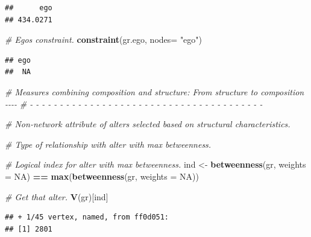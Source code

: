 \documentclass[
]{book}
\newenvironment{Shaded}{\begin{snugshade}}{\end{snugshade}}
\newcommand{\AttributeTok}[1]{\textcolor[rgb]{0.13,0.29,0.53}{#1}}
\newcommand{\CommentTok}[1]{\textcolor[rgb]{0.56,0.35,0.01}{\textit{#1}}}
\newcommand{\ConstantTok}[1]{\textcolor[rgb]{0.56,0.35,0.01}{#1}}
\newcommand{\FunctionTok}[1]{\textcolor[rgb]{0.13,0.29,0.53}{\textbf{#1}}}
\newcommand{\NormalTok}[1]{#1}
\newcommand{\OtherTok}[1]{\textcolor[rgb]{0.56,0.35,0.01}{#1}}
\newcommand{\SpecialCharTok}[1]{\textcolor[rgb]{0.81,0.36,0.00}{\textbf{#1}}}
\newcommand{\StringTok}[1]{\textcolor[rgb]{0.31,0.60,0.02}{#1}}
\begin{document}
\begin{verbatim}
##      ego 
## 434.0271
\end{verbatim}

\begin{Shaded}
\begin{Highlighting}[]
\CommentTok{\# Ego\textquotesingle{}s constraint.}
\FunctionTok{constraint}\NormalTok{(gr.ego, }\AttributeTok{nodes=} \StringTok{"ego"}\NormalTok{)}
\end{Highlighting}
\end{Shaded}

\begin{verbatim}
## ego 
##  NA
\end{verbatim}

\begin{Shaded}
\begin{Highlighting}[]
\CommentTok{\# Measures combining composition and structure: From structure to composition {-}{-}{-}{-}}
\CommentTok{\# {-} {-} {-} {-} {-} {-} {-} {-} {-} {-} {-} {-} {-} {-} {-} {-} {-} {-} {-} {-} {-} {-} {-} {-} {-} {-} {-} {-} {-} {-} {-} {-} {-} {-} {-} {-} {-} {-} {-} }

\CommentTok{\# Non{-}network attribute of alters selected based on structural characteristics.}

\CommentTok{\# Type of relationship with alter with max betweenness.}

\CommentTok{\# Logical index for alter with max betweenness.}
\NormalTok{ind }\OtherTok{\textless{}{-}} \FunctionTok{betweenness}\NormalTok{(gr, }\AttributeTok{weights =} \ConstantTok{NA}\NormalTok{) }\SpecialCharTok{==} \FunctionTok{max}\NormalTok{(}\FunctionTok{betweenness}\NormalTok{(gr, }\AttributeTok{weights =} \ConstantTok{NA}\NormalTok{))}

\CommentTok{\# Get that alter.}
\FunctionTok{V}\NormalTok{(gr)[ind]}
\end{Highlighting}
\end{Shaded}

\begin{verbatim}
## + 1/45 vertex, named, from ff0d051:
## [1] 2801
\end{verbatim}

\begin{Shaded}
\end{Shaded}
\end{document}
